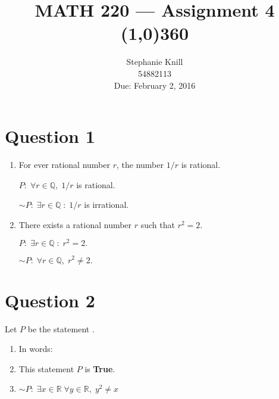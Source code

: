\documentclass[11pt, oneside]{article}   	%
\begin{document}
\title{MATH 220 --- Assignment 4 \\
\line(1,0){360} \\              %
}
\author{
Stephanie Knill \\
54882113 \\
Due: February 2, 2016}

\date{}                   %
\maketitle




\section*{Question 1}

\begin{enumerate}[ (a)]           
    \item For ever rational number $r$, the number $1/r$ is rational.
    
    $P: \; \forall r \in \mathbb{Q}, \; 1/r$ is rational.
    
    $\sim P: \; \exists r \in \mathbb{Q} \; :  \; 1/r$ is irrational. 
    
    \item There exists a rational number $r$ such that $r^2=2$.
    
    $P: \; \exists r \in \mathbb{Q} \; : \; r^2 =2.$
    
    $\sim P: \; \forall r \in \mathbb{Q}, \; r^2 \neq 2.$
\end{enumerate}


\section*{Question 2}

Let $P$ be the statement .

\begin{enumerate}[ (a)]           
    \item In words:    
    \item This statement $P$ is \textbf{True}.
    \item $\sim P: \; \exists x \in \mathbb{R} \; \forall{y} \in \mathbb{R}, \; y^2 \neq x$
        
\end{enumerate}
\end{document}
